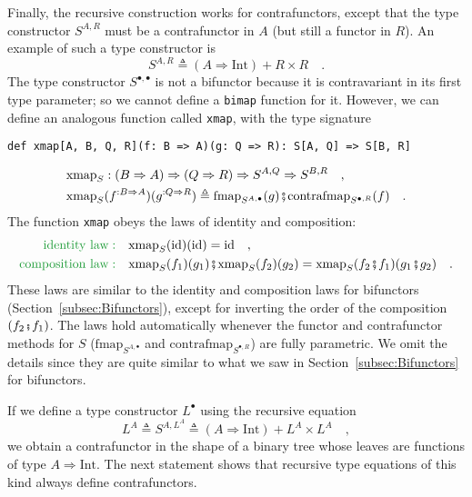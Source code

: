 Finally, the recursive construction works for contrafunctors, except
that the type constructor $S^{A,R}$ must be a contrafunctor in $A$
(but still a functor in $R$). An example of such a type constructor
is
\begin{equation}
S^{A,R}\triangleq\left(A\Rightarrow\text{Int}\right)+R\times R\quad.\label{eq:f-example-contra-bifunctor}
\end{equation}
The type constructor $S^{\bullet,\bullet}$ is not a bifunctor because
it is contravariant in its first type parameter; so we cannot define
a \lstinline!bimap! function for it. However, we can define an analogous
function called \lstinline!xmap!, with the type signature
\begin{lstlisting}
def xmap[A, B, Q, R](f: B => A)(g: Q => R): S[A, Q] => S[B, R]
\end{lstlisting}
\begin{align*}
 & \text{xmap}_{S}:\left(B\Rightarrow A\right)\Rightarrow\left(Q\Rightarrow R\right)\Rightarrow S^{A,Q}\Rightarrow S^{B,R}\quad,\\
 & \text{xmap}_{S}(f^{:B\Rightarrow A})(g^{:Q\Rightarrow R})\triangleq\text{fmap}_{S^{A,\bullet}}(g)\bef\text{contrafmap}_{S^{\bullet,R}}(f)\quad.
\end{align*}
The function \lstinline!xmap! obeys the laws of identity and composition:
\begin{align}
{\color{greenunder}\text{identity law}:}\quad & \text{xmap}_{S}(\text{id})(\text{id})=\text{id}\quad,\label{eq:f-profunctor-identity-law}\\
{\color{greenunder}\text{composition law}:}\quad & \text{xmap}_{S}(f_{1})(g_{1})\bef\text{xmap}_{S}(f_{2})(g_{2})=\text{xmap}_{S}(f_{2}\bef f_{1})(g_{1}\bef g_{2})\quad.\label{eq:f-profunctor-composition-law}
\end{align}
These laws are similar to the identity and composition laws for bifunctors
(Section~\ref{subsec:Bifunctors}), except for inverting the order
of the composition $\left(f_{2}\bef f_{1}\right)$. The laws hold
automatically whenever the functor and contrafunctor methods for $S$
($\text{fmap}_{S^{A,\bullet}}$ and $\text{contrafmap}_{S^{\bullet,R}}$)
are fully parametric. We omit the details since they are quite similar
to what we saw in Section~\ref{subsec:Bifunctors} for bifunctors.

If we define a type constructor $L^{\bullet}$ using the recursive
equation
\[
L^{A}\triangleq S^{A,L^{A}}\triangleq\left(A\Rightarrow\text{Int}\right)+L^{A}\times L^{A}\quad,
\]
we obtain a contrafunctor in the shape of a binary tree whose leaves
are functions of type $A\Rightarrow\text{Int}$. The next statement
shows that recursive type equations of this kind always define contrafunctors.

